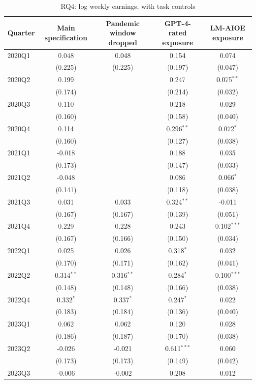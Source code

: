\begin{table}[htbp]\centering
\caption{RQ4: log weekly earnings, with task controls}
\begin{tabular}{lcccc}
\toprule
Quarter & Main specification & Pandemic window dropped & GPT-4-rated exposure & LM-AIOE exposure \\
\midrule
2020Q1 & 0.048 & 0.048 & 0.154 & 0.074 \\
 & (0.225) & (0.225) & (0.197) & (0.047) \\
2020Q2 & 0.199 &  & 0.247 & 0.075$^{**}$ \\
 & (0.174) &  & (0.214) & (0.032) \\
2020Q3 & 0.110 &  & 0.218 & 0.029 \\
 & (0.160) &  & (0.158) & (0.040) \\
2020Q4 & 0.114 &  & 0.296$^{**}$ & 0.072$^{*}$ \\
 & (0.160) &  & (0.127) & (0.038) \\
2021Q1 & -0.018 &  & 0.188 & 0.035 \\
 & (0.173) &  & (0.147) & (0.033) \\
2021Q2 & -0.048 &  & 0.086 & 0.066$^{*}$ \\
 & (0.141) &  & (0.118) & (0.038) \\
2021Q3 & 0.031 & 0.033 & 0.324$^{**}$ & -0.011 \\
 & (0.167) & (0.167) & (0.139) & (0.051) \\
2021Q4 & 0.229 & 0.228 & 0.243 & 0.102$^{***}$ \\
 & (0.167) & (0.166) & (0.150) & (0.034) \\
2022Q1 & 0.025 & 0.026 & 0.318$^{*}$ & 0.032 \\
 & (0.170) & (0.171) & (0.162) & (0.041) \\
2022Q2 & 0.314$^{**}$ & 0.316$^{**}$ & 0.284$^{*}$ & 0.100$^{***}$ \\
 & (0.148) & (0.148) & (0.166) & (0.038) \\
2022Q4 & 0.332$^{*}$ & 0.337$^{*}$ & 0.247$^{*}$ & 0.022 \\
 & (0.183) & (0.184) & (0.136) & (0.040) \\
2023Q1 & 0.062 & 0.062 & 0.120 & 0.028 \\
 & (0.186) & (0.187) & (0.170) & (0.038) \\
2023Q2 & -0.026 & -0.021 & 0.611$^{***}$ & 0.060 \\
 & (0.173) & (0.173) & (0.149) & (0.042) \\
2023Q3 & -0.006 & -0.002 & 0.208 & 0.012 \\

\end{tabular}
\end{table}
